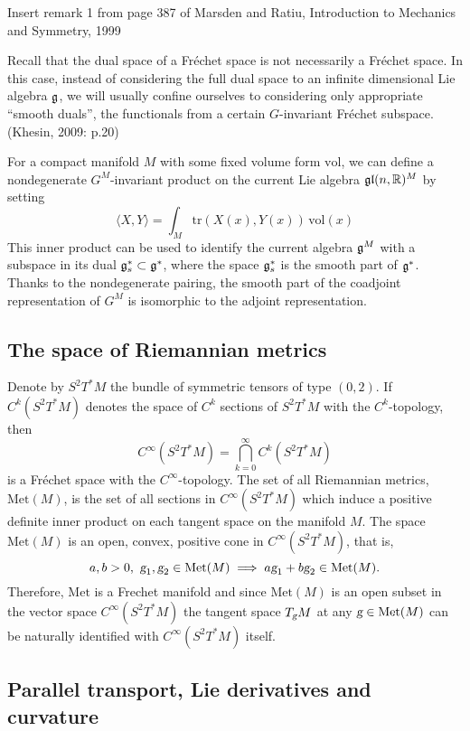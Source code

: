 \documentclass{article}
\theoremstyle{plain}
\theoremstyle{definition}
\newcommand{\R}{\ensuremath{\mathbb{R}}}
\newcommand{\g}{\ensuremath{\textsl{g}}}
\newcommand{\Met}{\ensuremath{\mathrm{Met}}}
\newcommand{\Vol}{\ensuremath{\mathrm{vol}}}
\newcommand{\tr}{\ensuremath{\mathrm{tr}}}
\newcommand{\mf}{\ensuremath{\mathfrak}}
\begin{document}
Insert remark 1 from page 387 of Marsden and Ratiu, Introduction to Mechanics and Symmetry, 1999



Recall that the dual space of a Fréchet space is not necessarily a Fréchet space. In this case, instead of considering the full dual space to an infinite dimensional Lie algebra $\mf g$, we will usually confine ourselves to considering only appropriate ``smooth duals'', the functionals from a certain $G$-invariant Fréchet subspace. (Khesin, 2009: p.20)

For a compact manifold $M$ with some fixed volume form $\Vol$, we can
define a nondegenerate $G^M$-invariant product on the current Lie algebra $\mf g\mf l(n,\R)^M$ by setting
\[
\langle X,Y\rangle = \int_M\tr(X(x),Y(x))\,\Vol(x)
\]
This inner product can be used to identify the current algebra $\mf g^M$ with a subspace in its dual $\mf g_s^*\subset \mf g^*$, where the space $\mf g_s^*$ is the smooth part of $\mf g^*$. Thanks to the nondegenerate pairing, the smooth part of the coadjoint representation of $G^M$ is isomorphic to the adjoint representation.




\subsection{The space of Riemannian metrics}
Denote by $S^2T^*M$ the bundle of  symmetric tensors of type $(0,2)$. If $C^k(S^2T^*M)$ denotes the space of $C^k$ sections of  $S^2T^*M$ with the $C^k$-topology, then
\[
C^\infty (S^2T^*M) = \bigcap_{k=0}^\infty C^k(S^2T^*M)
\]
is a Fréchet space with the $C^\infty$-topology. The set of all Riemannian metrics, $\Met(M)$, is the set of all sections in $C^\infty (S^2T^*M)$ which induce a positive definite inner product on each tangent space on the manifold $M$.
The space $\Met(M)$ is an open, convex, positive cone in $C^\infty(S^2T^*M)$, that is,
\[
a,b>0,\ \g_1,\g_2\in \Met(M) \implies a\g_1+b\g_2\in\Met(M).
\]
Therefore, $\Met$ is a Frechet manifold and since $\Met(M)$ is an open subset in the vector space $C^\infty (S^2T^*M)$  the tangent space $T_\g M$ at any $\g\in \Met(M)$ can be naturally identified with $C^\infty (S^2T^*M)$ itself.

\subsection{Parallel transport, Lie derivatives and curvature}
\end{document}
